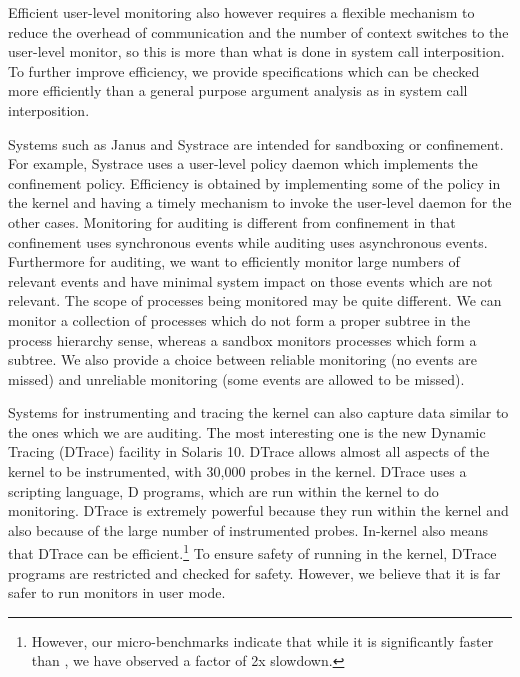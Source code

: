 Efficient user-level monitoring also however requires a 
flexible mechanism to reduce the overhead of communication and
the number of context switches to the user-level monitor, so this is more
than what is done in system call interposition.
To further improve efficiency, we provide specifications which
can be checked more efficiently than a general purpose argument analysis
as in system call interposition.

Systems such as Janus and Systrace are intended for sandboxing or
confinement.
For example, Systrace uses a user-level policy daemon which implements the
confinement policy. 
Efficiency is obtained by implementing some of
the policy in the kernel and having a timely mechanism to invoke
the user-level daemon for the other cases.
Monitoring for auditing is different from confinement in that confinement
uses synchronous events while auditing uses asynchronous events.
Furthermore for auditing, we want to 
efficiently monitor large numbers of relevant events
and have minimal system impact on those events which are
not relevant.
The scope of processes being monitored may be quite different.
We can monitor a collection of processes which
do not form a proper subtree in the process hierarchy sense,
whereas a sandbox monitors processes which form a subtree.
We also provide a choice between reliable monitoring (no events are missed)
and unreliable monitoring (some events are allowed to be missed).

Systems for instrumenting and tracing the kernel can also capture
data similar to the ones which we are auditing.
The most interesting one is the new
Dynamic Tracing (DTrace) facility \cite{dtrace-paper}
in Solaris 10.
DTrace allows almost all aspects of the kernel to
be instrumented, with 30,000 probes in the kernel.
DTrace uses a scripting language, D programs,
which are run within the kernel to do monitoring.
DTrace is extremely powerful because 
they run within the kernel and also because of the large number of
instrumented probes.
In-kernel also means that DTrace can be efficient.\footnote{
However, our micro-benchmarks indicate that while it is significantly
faster than , we have observed a factor of 2x slowdown.
}
To ensure safety of running in the kernel, DTrace programs
are restricted and checked for safety.
However, we believe that it is far safer to run monitors in user mode.

